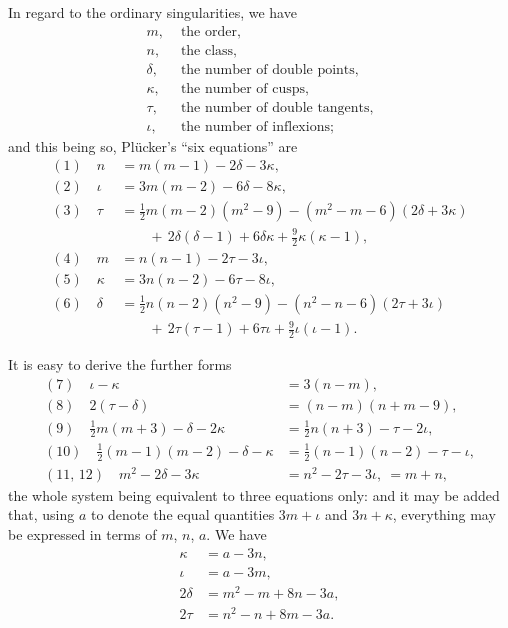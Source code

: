 \documentclass[12pt,a4paper,oneside]{book}
\begin{document}
In regard to the ordinary singularities, we have
\begin{align*}
m, &\text{ the order,}\\
n, &\text{ the class,}\\
\delta, &\text{ the number of double points,}\\
\kappa, &\text{ the number of cusps,}\\
\tau, &\text{ the number of double tangents,}\\
\iota, &\text{ the number of inflexions;}
\end{align*}
and this being so, Pl\"ucker's ``six equations'' are
\begin{align*}
(1)\quad n &= m(m-1)-2\delta-3\kappa,\\
(2)\quad \iota &= 3m(m-2)-6\delta-8\kappa,\\
(3)\quad \tau &= \tfrac{1}{2}m(m-2)(m^{2}-9)-(m^{2}-m-6)(2\delta+3\kappa)\\
            &\qquad +\,2\delta(\delta-1)+6\delta\kappa+\tfrac{9}{2}\kappa(\kappa-1),\\
(4)\quad m &= n(n-1)-2\tau-3\iota,\\
(5)\quad \kappa &= 3n(n-2)-6\tau-8\iota,\\
(6)\quad \delta &= \tfrac{1}{2}n(n-2)(n^{2}-9)-(n^{2}-n-6)(2\tau+3\iota)\\
                 &\qquad +\,2\tau(\tau-1)+6\tau\iota+\tfrac{9}{2}\iota(\iota-1).
\end{align*}

\newpage
It is easy to derive the further forms
\begin{align*}
(7)\quad \iota-\kappa &= 3(n-m),\\
(8)\quad 2(\tau-\delta) &= (n-m)(n+m-9),\\
(9)\quad \tfrac{1}{2}m(m+3)-\delta-2\kappa &= \tfrac{1}{2}n(n+3)-\tau-2\iota,\\
(10)\quad \tfrac{1}{2}(m-1)(m-2)-\delta-\kappa &= \tfrac{1}{2}(n-1)(n-2)-\tau-\iota,\\
(11,\,12)\quad m^{2}-2\delta-3\kappa &= n^{2}-2\tau-3\iota,\ =m+n,
\end{align*}
the whole system being equivalent to three equations only: and it may be added that, using $a$ to denote the equal quantities $3m+\iota$ and $3n+\kappa$, everything may be expressed in terms of $m$, $n$, $a$. We have
\begin{align*}
\kappa &= a-3n,\\
\iota &= a-3m,\\
2\delta &= m^{2}-m+8n-3a,\\
2\tau &= n^{2}-n+8m-3a.
\end{align*}
\end{document}
